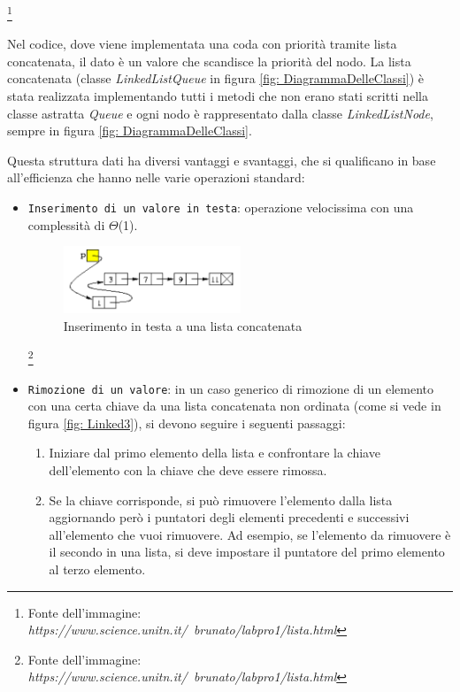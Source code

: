 \documentclass{article}
\begin{document}
\footnote{Fonte dell'immagine: \textit{https://www.science.unitn.it/~brunato/labpro1/lista.html}}

Nel codice, dove viene implementata una coda con priorità tramite lista concatenata, il dato è un valore che scandisce la priorità del nodo. La lista concatenata (classe \textit{LinkedListQueue} in figura \ref{fig: DiagrammaDelleClassi}) è stata realizzata implementando tutti i metodi che non erano stati scritti nella classe astratta \textit{Queue} e ogni nodo è rappresentato dalla classe \textit{LinkedListNode}, sempre in figura \ref{fig: DiagrammaDelleClassi}.

Questa struttura dati ha diversi vantaggi e svantaggi, che si qualificano in base all'efficienza che hanno nelle varie operazioni standard:

\begin{itemize}
    \item \verb|Inserimento di un valore in testa|: operazione velocissima con una complessità di $\Theta$(1).

    \begin{figure}[H]
    \includegraphics[width=0.5\textwidth]{Images/Linked2.png}
    \centering
    \caption{Inserimento in testa a una lista concatenata}
    \label{fig: Linked2}
    \end{figure}
    
    \footnote{Fonte dell'immagine: \textit{https://www.science.unitn.it/~brunato/labpro1/lista.html}}

    \item \verb|Rimozione di un valore|: in un caso generico di rimozione di un elemento con una certa chiave da una lista concatenata non ordinata (come si vede in figura \ref{fig: Linked3}), si devono seguire i seguenti passaggi:

    \begin{enumerate}
    
    \item Iniziare dal primo elemento della lista e confrontare la chiave dell'elemento con la chiave che deve essere rimossa.

    \item Se la chiave corrisponde, si può rimuovere l'elemento dalla lista aggiornando però i puntatori degli elementi precedenti e successivi all'elemento che vuoi rimuovere. Ad esempio, se l'elemento da rimuovere è il secondo in una lista, si deve impostare il puntatore del primo elemento al terzo elemento.
    

\end{enumerate}
\end{itemize}
\end{document}
